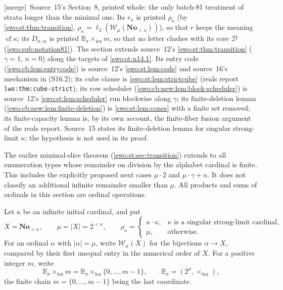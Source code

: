 \documentclass[11pt]{article}
\theoremstyle{definition}
\theoremstyle{remark}
\newcommand{\No}{\mathbf{No}}
\newcommand{\WO}{\mathcal W}
\newcommand{\B}{\mathbb B}
\newcommand{\lex}{\mathrm{lex}}
\newcommand{\cf}{\operatorname{cf}}
\newcommand{\bl}{\ell_2}
\newcommand{\code}[1]{\texttt{\small #1}}
\newcommand{\merge}{\textsf{[merge]}}
\begin{document}
\merge\ Source~15's Section~8, printed whole: the only batch-81 treatment of
strata longer than the minimal one. Its $r_\kappa$ is printed $\rho_\kappa$
(by \cref{swo:st:thm:transition}, $\rho_\kappa=\bl(\WO_\mu(\No_{<\kappa}))$), so
that $r$ keeps the meaning $\cf\kappa$; its $D_{\sigma,m}$ is printed
$\B_\sigma\times_\lex m$, so that no letter clashes with its core $\mathcal D$
(\cref{swo:sub:notation81}). The section extends source~12's
\cref{swo:st:thm:transition} ($\gamma=1$, $n=0$) along the targets of
\cref{swo:st:n14.1}. Its entry code (\cref{swo:cb:lem:entrycode}) is source~12's
\cref{swo:st:lem:code} and source~16's mechanism in (S16.2); its cube clause is
\cref{swo:st:lem:strictcube} (reals report \code{lwo:thm:cube-strict}); its row
scheduler (\cref{swo:cb:new:lem:block-scheduler}) is source~12's
\cref{swo:st:lem:scheduler} run blockwise along $\gamma$; its finite-deletion
lemma (\cref{swo:cb:new:lem:finite-deletion}) is \cref{swo:st:lem:cones} with a
finite set removed; its finite-capacity lemma is, by its own account, the
finite-fiber fusion argument of the reals report. Source~15 states its
finite-deletion lemma for singular strong-limit $\kappa$; the hypothesis is not
used in its proof.

The earlier minimal-slice theorem (\cref{swo:st:sec:transition}) extends to all enumeration types whose
remainder on division by the alphabet cardinal is finite.  This includes
the explicitly proposed next cases $\mu\cdot2$ and $\mu\cdot\gamma+n$.
It does not classify an additional infinite remainder smaller than $\mu$.
All products and sums of ordinals in this section are ordinal operations.

Let $\kappa$ be an infinite initial cardinal, and put
\[
 X=\No_{<\kappa},\qquad \mu=|X|=2^{<\kappa},\qquad
 \rho_\kappa=
 \begin{cases}
  \kappa\cdot\kappa,&\kappa\text{ is a singular strong-limit cardinal},\\
  \mu,&\text{otherwise}.
 \end{cases}
\]
For an ordinal $\alpha$ with $|\alpha|=\mu$, write $\WO_\alpha(X)$ for
the bijections $\alpha\to X$, compared by their first unequal entry in
the numerical order of $X$.  For a positive integer $m$, write
\[
 \B_\sigma\times_{\lex}m=\B_\sigma\times_{\mathrm{lex}}\{0,\ldots,m-1\},
 \qquad \B_\sigma=(2^\sigma,<_{\mathrm{lex}}),
\]
the finite chain $m=\{0,\ldots,m-1\}$ being the last coordinate.
\end{document}
